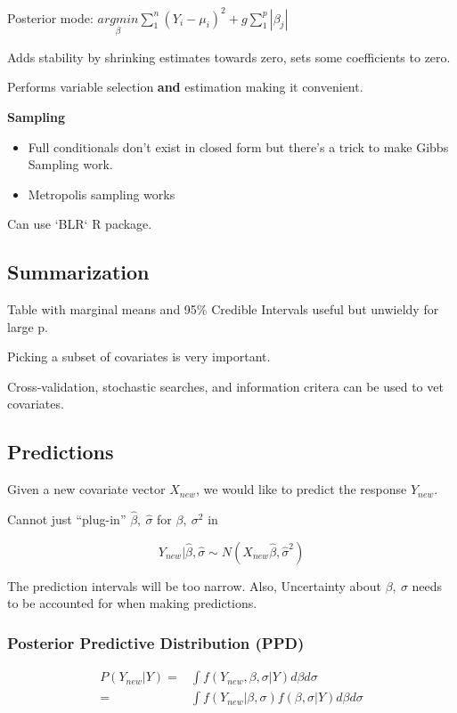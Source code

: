 \documentclass[11pt]{article}
\begin{document}
Posterior mode: \(\underset{\beta}{argmin} \sum_{1}^{n} (Y_i - \mu_i)^2 + g \sum_{1}^{p} |\beta_j|\)

Adds stability by shrinking estimates towards zero, sets some coefficients to
zero.

Performs variable selection \textbf{and} estimation making it convenient.

\textbf{Sampling}

\begin{itemize}
\item Full conditionals don't exist in closed form but there's a trick to make Gibbs
Sampling work.
\item Metropolis sampling works
\end{itemize}

Can use `BLR` R package.

\subsection{Summarization}
\label{sec:org871028a}

Table with marginal means and 95\% Credible Intervals useful but unwieldy for
large p.

Picking a subset of covariates is very important.

Cross-validation, stochastic searches, and information critera can be used to
vet covariates.


\subsection{Predictions}
\label{sec:org25f4fbe}

Given a new covariate vector \(X_{new}\), we would like to predict the response
\(Y_{new}\).

Cannot just ``plug-in'' \(\hat \beta, \ \hat \sigma\) for \(\beta, \ \sigma^2\) in

$$
Y_{new} | \hat \beta, \hat \sigma \sim N (X_{new} \hat \beta, \hat \sigma^2)
$$

The prediction intervals will be too narrow. Also, Uncertainty about \(\beta, \ \sigma\) needs to be accounted for when making predictions.

\subsubsection{Posterior Predictive Distribution (PPD)}
\label{sec:org8e8440b}

\begin{equation}
\begin{split}
P(Y_{new} | Y) = & \int f(Y_{new}, \beta, \sigma | Y) d \beta d \sigma\\
 = & \int f(Y_{new} | \beta, \sigma) f(\beta, \sigma | Y) d \beta d \sigma\\
\end{split}
\end{equation}
\end{document}
